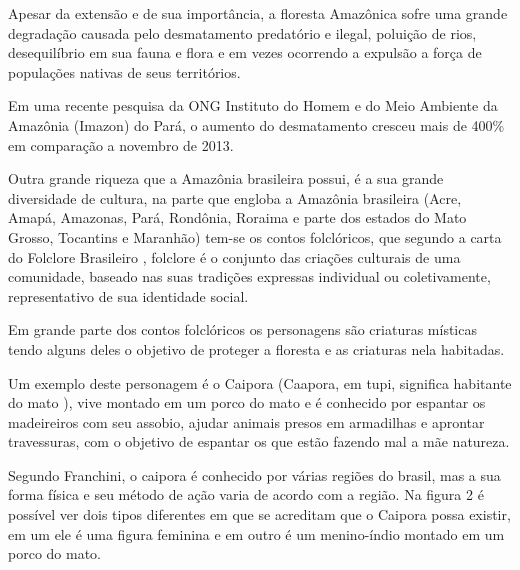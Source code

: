 Apesar da extensão e de sua importância, a floresta Amazônica sofre uma grande degradação causada pelo desmatamento predatório e ilegal, poluição de rios, desequilíbrio em sua fauna e flora e em vezes ocorrendo a expulsão a força de populações nativas de seus territórios.

Em uma recente pesquisa da ONG Instituto do Homem e do Meio Ambiente da Amazônia (Imazon) do Pará, o aumento do desmatamento cresceu mais de 400\% em comparação a novembro de 2013. \cite{des}

Outra grande riqueza que a Amazônia brasileira possui, é a sua grande diversidade de cultura, na parte que engloba a Amazônia brasileira (Acre, Amapá, Amazonas, Pará, Rondônia, Roraima e parte dos estados do Mato Grosso, Tocantins e Maranhão) tem-se os contos folclóricos, que segundo a carta do Folclore Brasileiro \cite{fc}, folclore é o conjunto das criações culturais de uma comunidade, baseado nas suas tradições expressas individual ou coletivamente, representativo de sua identidade social.

Em grande parte dos contos folclóricos os personagens são criaturas místicas tendo alguns deles o objetivo de proteger a floresta e as criaturas nela habitadas.


Um exemplo deste personagem é o Caipora (Caapora, em tupi, significa habitante do mato \cite{sig}), vive montado em um porco do mato e é conhecido por espantar os madeireiros com seu assobio, ajudar animais presos em armadilhas e aprontar travessuras, com o objetivo de espantar os que estão fazendo mal a mãe natureza. 

Segundo Franchini, o caipora é conhecido por várias regiões do brasil, mas a sua forma física e seu método de ação varia de acordo com a região.
Na figura 2 é possível ver dois tipos diferentes em que se acreditam que o Caipora possa existir, em um ele é uma figura feminina e em outro é um menino-índio montado em um porco do mato. \cite{100}

\begin{figure}[h!]
		\centering
	\end{figure}